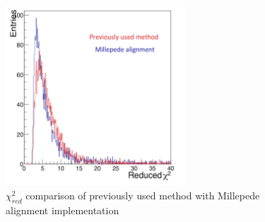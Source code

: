 \begin{figure}[h!]
\centering
\includegraphics[width=0.6\textwidth]{thesis_figures/alignment/red_chi2_navsm_final.png}
\caption{$\chi_{red}^2$ comparison of previously used method with Millepede alignment implementation}
\label{fig:red_chi2_2}
\end{figure}


